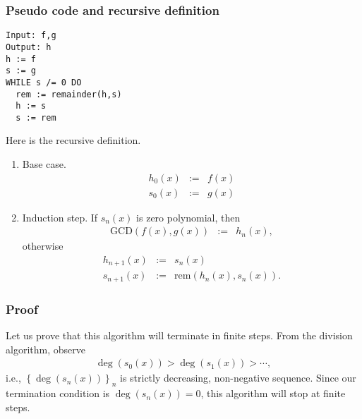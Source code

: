 \documentclass[11pt]{book}
\begin{document}
\subsubsection{Pseudo code and recursive definition}
\begin{verbatim}
Input: f,g
Output: h
h := f
s := g
WHILE s /= 0 DO
  rem := remainder(h,s)
  h := s
  s := rem
\end{verbatim}

Here is the recursive definition.
\begin{enumerate}
\item Base case.
\begin{eqnarray}
h_0(x) &:=& f(x) \\
s_0(x) &:=& g(x) %
\end{eqnarray}

\item Induction step.
If $s_n(x)$ is zero polynomial, then
\begin{eqnarray}
\text{GCD}\left( f(x), g(x) \right) &:=& h_n(x),
\end{eqnarray}
otherwise
\begin{eqnarray}
h_{n+1}(x) &:=& s_n(x) \\
s_{n+1}(x) &:=& \text{rem}\left( h_n(x), s_n(x) \right) .
\end{eqnarray}

\end{enumerate}

\subsubsection{Proof}
Let us prove that this algorithm will terminate in finite steps.
From the division algorithm, observe
\begin{eqnarray}
\deg\left( s_0(x) \right) > \deg\left( s_1(x) \right) > \cdots,
\end{eqnarray}
i.e., $\left\{ \deg\left( s_n(x) \right) \right\}_n$ is strictly decreasing, non-negative sequence.
Since our termination condition is $\deg\left( s_n(x) \right)=0$, this algorithm will stop at finite steps.
\end{document}
